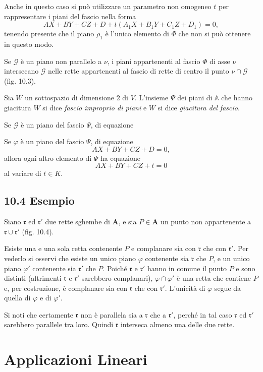 \documentclass{article}
\theoremstyle{plain}
\theoremstyle{definition}
\theoremstyle{remark}
\begin{document}
Anche in questo caso si può utilizzare un parametro non omogeneo $t$ per rappresentare i piani del fascio nella forma
\[
AX + BY + CZ + D + t(A_1 X + B_1 Y + C_1 Z + D_1) = 0,
\]
tenendo presente che il piano $\rho_1$ è l'unico elemento di $\Phi$ che non si può ottenere in questo modo.

Se $\mathscr{G}$ è un piano non parallelo a $\nu$, i piani appartenenti al fascio $\Phi$ di asse $\nu$ intersecano $\mathscr{G}$ nelle rette appartenenti al fascio di rette di centro il punto $\nu \cap \mathscr{G}$ (fig. 10.3).

Sia $W$ un sottospazio di dimensione 2 di $V$. L'insieme $\Psi$ dei piani di $\mathbb{A}$ che hanno giacitura $W$ si dice \textit{fascio improprio di piani} e $W$ si dice \textit{giacitura del fascio}.

Se $\mathscr{G}$ è un piano del fascio $\Psi$, di equazione

Se $\varphi$ è un piano del fascio $\Psi$, di equazione
\[AX + BY + CZ + D = 0,\]
allora ogni altro elemento di $\Psi$ ha equazione
\[AX + BY + CZ + t = 0\]
al variare di $t \in K$.

\subsection*{10.4 Esempio}
Siano $\mathfrak{r}$ ed $\mathfrak{r}'$ due rette sghembe di $\mathbf{A}$, e sia $P \in \mathbf{A}$ un punto non appartenente a $\mathfrak{r} \cup \mathfrak{r}'$ (fig. 10.4).

Esiste una e una sola retta contenente $P$ e complanare sia con $\mathfrak{r}$ che con $\mathfrak{r}'$. Per vederlo si osservi che esiste un unico piano $\varphi$ contenente sia $\mathfrak{r}$ che $P$, e un unico piano $\varphi'$ contenente sia $\mathfrak{r}'$ che $P$. Poiché $\mathfrak{r}$ e $\mathfrak{r}'$ hanno in comune il punto $P$ e sono distinti (altrimenti $\mathfrak{r}$ e $\mathfrak{r}'$ sarebbero complanari), $\varphi \cap \varphi'$ è una retta che contiene $P$ e, per costruzione, è complanare sia con $\mathfrak{r}$ che con $\mathfrak{r}'$. L'unicità di $\varphi$ segue da quella di $\varphi$ e di $\varphi'$.

Si noti che certamente $\mathfrak{r}$ non è parallela sia a $\mathfrak{r}$ che a $\mathfrak{r}'$, perché in tal caso $\mathfrak{r}$ ed $\mathfrak{r}'$ sarebbero parallele tra loro. Quindi $\mathfrak{r}$ interseca almeno una delle due rette.


\vspace{50pt}
\section{Applicazioni Lineari}
\vspace{20pt}
\end{document}
